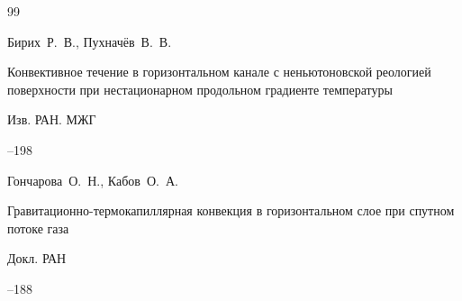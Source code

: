 \begin{thebibliography}{99}







\by Бирих~Р.~В., Пухначёв~В.~В.

\paper Конвективное течение в горизонтальном канале с неньютоновской реологией поверхности при нестационарном продольном градиенте температуры

\jour Изв. РАН. МЖГ



--198

















\by  Гончарова~О.~Н.,  Кабов~О.~А.

\paper Гравитационно-термокапиллярная конвекция в горизонтальном слое при спутном потоке газа

\jour Докл. РАН




--188








\end{thebibliography}
